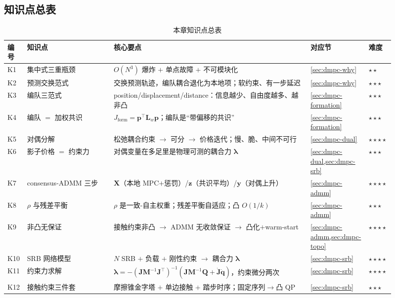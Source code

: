 \subsection*{知识点总表}
\begin{table}[H]\centering\small
\caption{本章知识点总表}
\label{tab:dmpc-knowledge}
\begin{tabular}{p{0.05\linewidth}p{0.22\linewidth}p{0.50\linewidth}p{0.10\linewidth}p{0.04\linewidth}}
\toprule
编号 & 知识点 & 核心要点 & 对应节 & 难度 \\
\midrule
K1 & 集中式三重瓶颈 & $O(N^3)$ 爆炸 $+$ 单点故障 $+$ 不可模块化 & \cref{sec:dmpc-why} & $\star\star$ \\
K2 & 预测交换范式 & 交换预测轨迹，编队耦合退化为本地项；软约束、有一步延迟 & \cref{sec:dmpc-why} & $\star\star\star$ \\
K3 & 编队三范式 & position/displacement/distance：信息越少、自由度越多、越非凸 & \cref{sec:dmpc-formation} & $\star\star\star$ \\
K4 & 编队 $=$ 加权共识 & $J_{\text{form}}=\mathbf{p}^\top \mathbf{L}_w\mathbf{p}$；编队是“带偏移的共识” & \cref{sec:dmpc-formation} & $\star\star\star$ \\
K5 & 对偶分解 & 松弛耦合约束 $\to$ 可分 $\to$ 价格迭代；慢、脆、中间不可行 & \cref{sec:dmpc-dual} & $\star\star\star\star$ \\
K6 & 影子价格 $=$ 约束力 & 对偶变量在多足里是物理可测的耦合力 $\boldsymbol{\lambda}$ & \cref{sec:dmpc-dual,sec:dmpc-srb} & $\star\star\star$ \\
K7 & consensus-ADMM 三步 & $\mathbf{X}$（本地 MPC$+$惩罚）/$\mathbf{z}$（共识平均）/$\mathbf{y}$（对偶上升） & \cref{sec:dmpc-admm} & $\star\star\star\star$ \\
K8 & $\rho$ 与残差平衡 & $\rho$ 是一致-自主权重；残差平衡自适应；凸 $O(1/k)$ & \cref{sec:dmpc-admm} & $\star\star\star$ \\
K9 & 非凸无保证 & 接触约束非凸 $\to$ ADMM 无收敛保证 $\to$ 凸化$+$warm-start & \cref{sec:dmpc-admm,sec:dmpc-topo} & $\star\star\star\star$ \\
K10 & SRB 网络模型 & $N$ SRB $+$ 负载 $+$ 刚性约束 $\to$ 耦合力 $\boldsymbol{\lambda}$ & \cref{sec:dmpc-srb} & $\star\star\star\star$ \\
K11 & 约束力求解 & $\boldsymbol{\lambda}=-(\mathbf{J}\mathbf{M}^{-1}\mathbf{J}^\top)^{-1}(\mathbf{J}\mathbf{M}^{-1}\mathbf{Q}+\dot{\mathbf{J}}\dot{\mathbf{q}})$，约束微分两次 & \cref{sec:dmpc-srb} & $\star\star\star\star$ \\
K12 & 接触约束三件套 & 摩擦锥金字塔 $+$ 单边接触 $+$ 踏步时序；固定序列$\to$凸 QP & \cref{sec:dmpc-srb} & $\star\star\star$ \\

\end{tabular}
\end{table}
